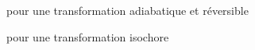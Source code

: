 




\begin{enonce}
pour une transformation adiabatique et réversible
\end{enonce}




\begin{enonce}
pour une transformation isochore
\end{enonce}





\finEntrainement


\minusSmallskip





\hauteurLargeurCadreReponse		{6mm}{4cm}
\initialisationEntrainement


